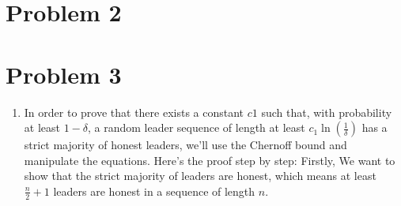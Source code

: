 \documentclass{article}
\begin{document}
\section*{Problem 2}

\section*{Problem 3}
\begin{enumerate}
    \item In order to prove that there exists a constant $c1$ such that, with probability at least $1−\delta$, a random leader sequence of length at least
$c_1 \ln(\frac{1}{\delta})$
has a strict majority of honest leaders, we'll use the Chernoff bound and manipulate the equations.
Here's the proof step by step:
Firstly, We want to show that the strict majority of leaders are honest, which means at least $\frac{n}{2} + 1$ leaders are honest in a sequence of length $n$. 


\end{enumerate}
\end{document}
